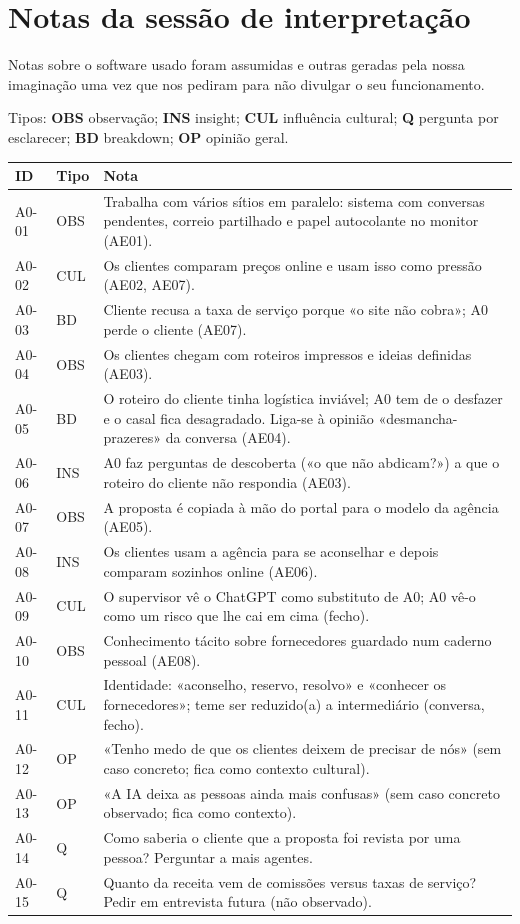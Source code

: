 \documentclass[11pt,a4paper]{article}
\begin{document}
\section{Notas da sessão de interpretação}
\begin{aviso}
  Notas sobre o software usado foram assumidas e outras geradas pela nossa imaginação
  uma vez que nos pediram para não divulgar o seu funcionamento.
\end{aviso}
Tipos: \textbf{OBS} observação; \textbf{INS} insight; \textbf{CUL} influência cultural; \textbf{Q} pergunta por esclarecer; \textbf{BD} breakdown; \textbf{OP} opinião geral.

{\small
\begin{longtable}{@{}p{1.5cm}p{1.1cm}p{11.8cm}@{}}
\toprule
\textbf{ID} & \textbf{Tipo} & \textbf{Nota} \\ \midrule \endhead
A0-01 & OBS & Trabalha com vários sítios em paralelo: sistema com conversas pendentes, correio partilhado e papel autocolante no monitor (AE01). \\
A0-02 & CUL & Os clientes comparam preços online e usam isso como pressão (AE02, AE07). \\
A0-03 & BD & Cliente recusa a taxa de serviço porque «o site não cobra»; A0 perde o cliente (AE07). \\
A0-04 & OBS & Os clientes chegam com roteiros impressos e ideias definidas (AE03). \\
A0-05 & BD & O roteiro do cliente tinha logística inviável; A0 tem de o desfazer e o casal fica desagradado. Liga-se à opinião «desmancha-prazeres» da conversa (AE04). \\
A0-06 & INS & A0 faz perguntas de descoberta («o que não abdicam?») a que o roteiro do cliente não respondia (AE03). \\
A0-07 & OBS & A proposta é copiada à mão do portal para o modelo da agência (AE05). \\
A0-08 & INS & Os clientes usam a agência para se aconselhar e depois comparam sozinhos online (AE06). \\
A0-09 & CUL & O supervisor vê o ChatGPT como substituto de A0; A0 vê-o como um risco que lhe cai em cima (fecho). \\
A0-10 & OBS & Conhecimento tácito sobre fornecedores guardado num caderno pessoal (AE08). \\
A0-11 & CUL & Identidade: «aconselho, reservo, resolvo» e «conhecer os fornecedores»; teme ser reduzido(a) a intermediário (conversa, fecho). \\
A0-12 & OP & «Tenho medo de que os clientes deixem de precisar de nós» (sem caso concreto; fica como contexto cultural). \\
A0-13 & OP & «A IA deixa as pessoas ainda mais confusas» (sem caso concreto observado; fica como contexto). \\
A0-14 & Q & Como saberia o cliente que a proposta foi revista por uma pessoa? Perguntar a mais agentes. \\
A0-15 & Q & Quanto da receita vem de comissões versus taxas de serviço? Pedir em entrevista futura (não observado). \\
\bottomrule
\end{longtable}}
\end{document}
